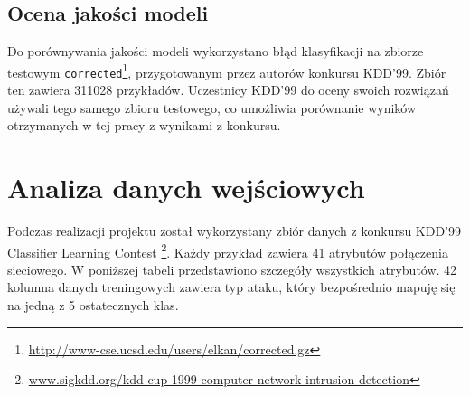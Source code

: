 \documentclass[a4paper, 12pt]{article}
\begin{document}
\subsection{Ocena jakości modeli}
Do porównywania jakości modeli wykorzystano błąd klasyfikacji na zbiorze testowym 
\texttt{corrected}\footnote{\url{http://www-cse.ucsd.edu/users/elkan/corrected.gz}},
przygotowanym przez autorów konkursu KDD'99.
Zbiór ten zawiera 311028 przykładów. 
Uczestnicy KDD'99 do oceny swoich rozwiązań używali tego samego zbioru testowego,
co umożliwia porównanie wyników otrzymanych w tej pracy z wynikami z konkursu.

\section{Analiza danych wejściowych}

Podczas realizacji projektu został wykorzystany zbiór danych z konkursu 
KDD'99 Classifier Learning Contest
\footnote{\url{www.sigkdd.org/kdd-cup-1999-computer-network-intrusion-detection}}.
Każdy przykład zawiera 41 atrybutów połączenia sieciowego. W poniższej tabeli przedstawiono
szczegóły wszystkich atrybutów.
42 kolumna danych treningowych zawiera typ ataku, który bezpośrednio mapuję się na
jedną z 5 ostatecznych klas. \\
\end{document}
